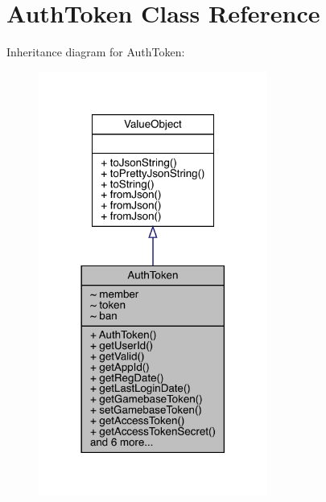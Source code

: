 \hypertarget{classcom_1_1toast_1_1android_1_1gamebase_1_1auth_1_1data_1_1_auth_token}{}\section{Auth\+Token Class Reference}
\label{classcom_1_1toast_1_1android_1_1gamebase_1_1auth_1_1data_1_1_auth_token}


Inheritance diagram for Auth\+Token\+:
\nopagebreak
\begin{figure}[H]
\begin{center}
\leavevmode
\includegraphics[width=213pt]{classcom_1_1toast_1_1android_1_1gamebase_1_1auth_1_1data_1_1_auth_token__inherit__graph}
\end{center}
\end{figure}


